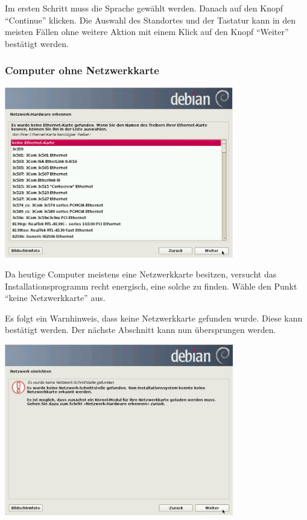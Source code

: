 \documentclass[a4paper,12pt,twoside]{article}
\begin{document}
Im ersten Schritt muss die Sprache gewählt werden. Danach auf den Knopf
"`Continue"' klicken. Die Auswahl des
Standortes und der Tastatur kann in den meisten Fällen ohne weitere
Aktion mit einem Klick auf den Knopf
"`Weiter"' bestätigt werden.


\subsubsection{Computer ohne Netzwerkkarte}
\label{sct:inst_ohne_netzwerk}

\begin{minipage}{\linewidth}
  \centering
  \includegraphics[width=10cm]{efaLivede-img/efaLivede-img5.png}
  \label{fig:inst_netzwerkkarte}
\end{minipage}

Da heutige Computer meistens eine Netzwerkkarte besitzen, versucht das
Installationsprogramm recht energisch, eine solche zu finden. Wähle den
Punkt "`keine Netzwerkkarte"' aus.

Es folgt ein Warnhinweis, dass keine Netzwerkkarte gefunden wurde. Diese
kann bestätigt werden. Der nächste Abschnitt kann nun übersprungen
werden.

\begin{minipage}{\linewidth}
  \centering
  \includegraphics[width=10cm]{efaLivede-img/efaLivede-img6.png}
  \label{fig:inst_best_netzwerkkarte}
\end{minipage}
\end{document}
